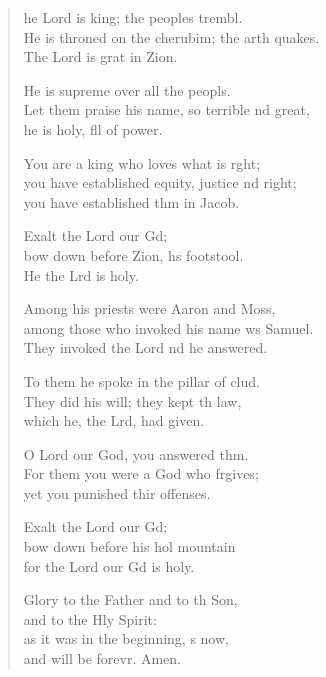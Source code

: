 \begin{verse}
  \begin{patverse}
he Lord is king; the peoples trembl.\Flex\\
He is throned on the cherubim; the arth quakes.\Med\\
The Lord is grat in Zion.

He is supreme over all the peopls.\Flex\\
Let them praise his name, so terrible nd great,\Med\\
he is holy, fll of power.

You are a king who loves what is r\pointup{\i}ght;\Flex\\
you have established equity, justice nd right;\Med\\
you have established thm in Jacob.

Exalt the Lord our Gd;\Flex\\
bow down before Zion, h\pointup{\i}s footstool.\Med\\
He the Lrd is holy.

Among his priests were Aaron and Moss,\Flex\\
among those who invoked his name ws Samuel.\Med\\
They invoked the Lord nd he answered.

To them he spoke in the pillar of clud.\Flex\\
They did his will; they kept th law,\Med\\
which he, the Lrd, had given.

O Lord our God, you answered thm.\Flex\\
For them you were a God who frgives;\Med\\
yet you punished thir offenses.

Exalt the Lord our Gd;\Flex\\
bow down before his hol mountain\Med\\
for the Lord our Gd is holy.

Glory to the Father and to th Son,\Med\\
and to the Hly Spirit:\\
as it was in the beginning, \pointup{\i}s now,\Med\\
and will be forevr. Amen.
  \end{patverse}
\end{verse}
